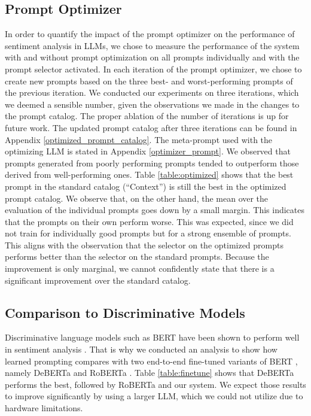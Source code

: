 \documentclass{article}
\theoremstyle{plain}
\theoremstyle{definition}
\theoremstyle{remark}
\begin{document}
\subsection{Prompt Optimizer}\label{prompt_optimizer}
In order to quantify the impact of the prompt optimizer on the performance of sentiment analysis in LLMs, we chose to measure the performance of the system with and without prompt optimization on all prompts individually and with the prompt selector activated. In each iteration of the prompt optimizer, we chose to create new prompts based on the three best- and worst-performing prompts of the previous iteration. We conducted our experiments on three iterations, which we deemed a sensible number, given the observations we made in the changes to the prompt catalog. The proper ablation of the number of iterations is up for future work. The updated prompt catalog after three iterations can be found in Appendix \ref{optimized_prompt_catalog}. The meta-prompt used with the optimizing LLM is stated in Appendix \ref{optimizer_prompt}. We observed that prompts generated from poorly performing prompts tended to outperform those derived from well-performing ones.
Table \ref{table:optimized} shows that the best prompt in the standard catalog (``Context'') is still the best in the optimized prompt catalog. We observe that, on the other hand, the mean over the evaluation of the individual prompts goes down by a small margin. This indicates that the prompts on their own perform worse.
This was expected, since we did not train for individually good prompts but for a strong ensemble of prompts. This aligns with the observation that the selector on the optimized prompts performs better than the selector on the standard prompts. Because the improvement is only marginal, we cannot confidently state that there is a significant improvement over the standard catalog.


\subsection{Comparison to Discriminative Models}
Discriminative language models such as BERT have been shown to perform well in sentiment analysis \cite{roberta} \cite{discriminativeMullick}. That is why we conducted an analysis to show how learned prompting compares with two end-to-end fine-tuned variants of BERT \cite{bert}, namely DeBERTa \cite{deberta} and RoBERTa \cite{roberta}. Table \ref{table:finetune} shows that DeBERTa performs the best, followed by RoBERTa and our system. We expect those results to improve significantly by using a larger LLM, which we could not utilize due to hardware limitations.
\end{document}
